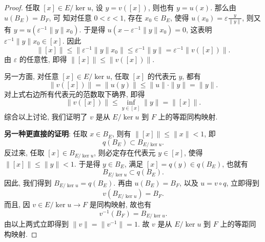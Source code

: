 \begin{proof}
    任取 $[x]\in E/\ker u$, 设 $y=v([x])$, 则也有 $y=u(x)$. 那么由 $u(B_{E})=B_{F}$, 可
    知对任意 $0<\varepsilon<1$, 存在 $x_{0}\in B_{E}$, 使得 
    $u(x_0)=\varepsilon \frac{y}{\|y\|}$, 则又有 $y=u(\varepsilon^{-1}\|y\| x_{0})$.
    于是得 $u(x-\varepsilon^{-1}\|y\| x_{0})=0$, 这表明 $\varepsilon^{-1}\|y\| x_{0}\in [x]$. 因此
    \[
    \|[x]\| \leq\bigl\|\varepsilon^{-1}\|y\|x_{0}\bigr\|\leq\varepsilon^{-1}\|y\|=\varepsilon^{-1}\|v([x])\| .
    \]
    由 $\varepsilon$ 的任意性, 即得 $\|[x]\|\leq\|v([x])\|$.

    另一方面, 对任意 $[x]\in E/\ker u$, 任取 $[x]$ 的代表元 $y$, 都有
    \[
    \|v([x])\|=\|u(y)\| \leq\|u\|\cdot\|y\|=\|y\|.
    \]
    对上式右边所有代表元的范数取下确界, 即得
    \[\|v([x])\|\leq\inf_{y\in [x]}\|y\|=\|[x]\|.\]
    综合以上讨论, 我们证明了 $v$ 是从 $E/\ker u$ 到 $F$ 上的等距同构映射.

    \textbf{另一种更直接的证明}:
    任取 $x\in B_E$, 则有 $\|[x]\|\leq\|x\|<1$, 即
    \[q(B_E)\subset B_{E/\ker u}.\]
    反过来, 任取 $[x]\in B_{E/\ker u}$, 则必定存在代表元 $y\in[x]$, 
    使得 $\|[x]\|\leq\|y\|<1$. 于是得 $y\in B_{E}$, 满足 $[x]=q(y)\in q(B_{E})$, 也就有
    \[
    B_{E/\ker u}\subset q(B_{E}).
    \]
    因此, 我们得到 $B_{E/\ker u}=q(B_{E})$. 再由 $u(B_{E})=B_{F}$, 以及 $u=v \circ q$, 立即得到
    \[
    v(B_{E/\ker u})=B_{F}.
    \]
    而且, 因 $v\in E/\ker u\to F$ 是同构映射, 故也有
    \[
    v^{-1}(B_{F})=B_{E/\ker u}.
    \]
    由以上两式立即得到 $\|v\|=\|v^{-1}\|=1$. 故 $v$ 是从 $E/\ker u$ 到 $F$ 上的等距同构映射.
\end{proof}
